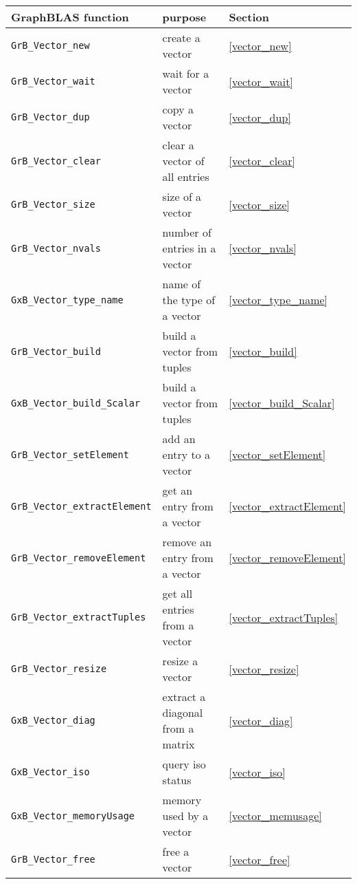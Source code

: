 \documentclass[12pt]{article}
\begin{document}
\vspace{0.2in}
\noindent
{\footnotesize
\begin{tabular}{lll}
GraphBLAS function   & purpose                                      & Section \\
\hline
\verb'GrB_Vector_new'            & create a vector                  & \ref{vector_new} \\
\verb'GrB_Vector_wait'           & wait for a vector                & \ref{vector_wait} \\
\verb'GrB_Vector_dup'            & copy a vector                    & \ref{vector_dup} \\
\verb'GrB_Vector_clear'          & clear a vector of all entries    & \ref{vector_clear} \\
\verb'GrB_Vector_size'           & size of a vector                 & \ref{vector_size} \\
\verb'GrB_Vector_nvals'          & number of entries in a vector    & \ref{vector_nvals} \\
\verb'GxB_Vector_type_name'      & name of the type of a vector     & \ref{vector_type_name} \\
\verb'GrB_Vector_build'          & build a vector from tuples       & \ref{vector_build} \\
\verb'GxB_Vector_build_Scalar'   & build a vector from tuples       & \ref{vector_build_Scalar} \\
\verb'GrB_Vector_setElement'     & add an entry to a vector         & \ref{vector_setElement} \\
\verb'GrB_Vector_extractElement' & get an entry from a vector       & \ref{vector_extractElement} \\
\verb'GrB_Vector_removeElement'  & remove an entry from a vector    & \ref{vector_removeElement} \\
\verb'GrB_Vector_extractTuples'  & get all entries from a vector    & \ref{vector_extractTuples} \\
\verb'GrB_Vector_resize'         & resize a vector                  & \ref{vector_resize} \\
\verb'GxB_Vector_diag'           & extract a diagonal from a matrix & \ref{vector_diag} \\
\verb'GxB_Vector_iso'            & query iso status                 & \ref{vector_iso} \\
\verb'GxB_Vector_memoryUsage'    & memory used by a vector          & \ref{vector_memusage} \\
\verb'GrB_Vector_free'           & free a vector                    & \ref{vector_free} \\

\end{tabular}}
\end{document}
